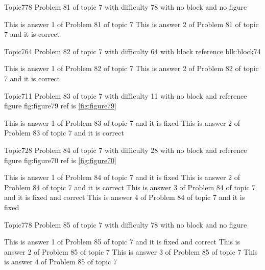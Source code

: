 \documentclass[master]{exam}
\begin{document}
\begin{problem}{Topic7}{78}
	Problem 81 of topic 7 with difficulty 78 with no block and no figure
	\begin{answers}
		\answer This is answer 1 of Problem 81 of topic 7 
		\answer[correct] This is answer 2 of Problem 81 of topic 7 and it is correct
	\end{answers}
\end{problem}

\begin{problem}[requires=blk:block74]{Topic7}{64}
	Problem 82 of topic 7 with difficulty 64 with block reference blk:block74
	\begin{answers}
		\answer This is answer 1 of Problem 82 of topic 7 
		\answer[correct] This is answer 2 of Problem 82 of topic 7 and it is correct
	\end{answers}
\end{problem}

\begin{problem}{Topic7}{11}
	Problem 83 of topic 7 with difficulty 11 with no block and reference figure fig:figure79 ref is \ref{fig:figure79}
	\begin{answers}
		\answer[fixed] This is answer 1 of Problem 83 of topic 7 and it is fixed
		\answer[correct] This is answer 2 of Problem 83 of topic 7 and it is correct
	\end{answers}
\end{problem}

\begin{problem}{Topic7}{28}
	Problem 84 of topic 7 with difficulty 28 with no block and reference figure fig:figure70 ref is \ref{fig:figure70}
	\begin{answers}
		\answer[fixed] This is answer 1 of Problem 84 of topic 7 and it is fixed
		\answer[correct] This is answer 2 of Problem 84 of topic 7 and it is correct
		 This is answer 3 of Problem 84 of topic 7 and it is fixed and correct
		\answer[fixed] This is answer 4 of Problem 84 of topic 7 and it is fixed
	\end{answers}
\end{problem}

\begin{problem}{Topic7}{78}
	Problem 85 of topic 7 with difficulty 78 with no block and no figure
	\begin{answers}
		 This is answer 1 of Problem 85 of topic 7 and it is fixed and correct
		\answer This is answer 2 of Problem 85 of topic 7 
		\answer This is answer 3 of Problem 85 of topic 7 
		\answer This is answer 4 of Problem 85 of topic 7 
	\end{answers}
\end{problem}
\end{document}
